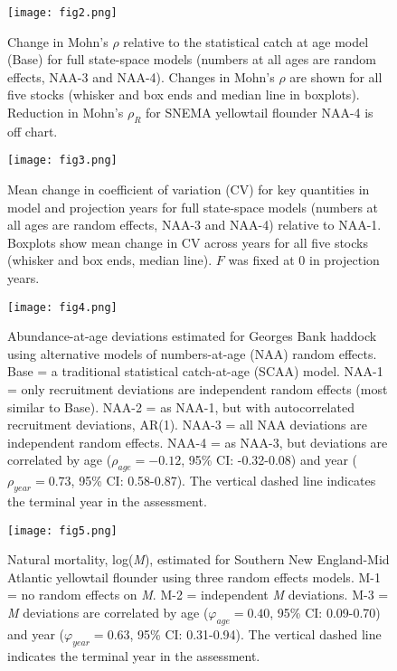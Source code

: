 \documentclass[]{article}
\begin{document}
\begin{figure}

{\centering \texttt{[image: fig2.png]} 

}

\caption{Change in Mohn's $\rho$ relative to the statistical catch at age model (Base) for full state-space models (numbers at all ages are random effects, NAA-3 and NAA-4). Changes in Mohn's $\rho$ are shown for all five stocks (whisker and box ends and median line in boxplots). Reduction in Mohn's $\rho_R$ for SNEMA yellowtail flounder NAA-4 is off chart.}\label{fig:mohns}
\end{figure}

\pagebreak

\begin{figure}

{\centering \texttt{[image: fig3.png]} 

}

\caption{Mean change in coefficient of variation (CV) for key quantities in model and projection years for full state-space models (numbers at all ages are random effects, NAA-3 and NAA-4) relative to NAA-1. Boxplots show mean change in CV across years for all five stocks (whisker and box ends, median line). $F$ was fixed at 0 in projection years.}\label{fig:cv}
\end{figure}

\pagebreak

\begin{figure}

{\centering \texttt{[image: fig4.png]} 

}

\caption{Abundance-at-age deviations estimated for Georges Bank haddock using alternative models of numbers-at-age (NAA) random effects. Base = a traditional statistical catch-at-age (SCAA) model. NAA-1 = only recruitment deviations are independent random effects (most similar to Base). NAA-2 = as NAA-1, but with autocorrelated recruitment deviations, AR(1). NAA-3 = all NAA deviations are independent random effects. NAA-4 = as NAA-3, but deviations are correlated by age ($\rho_{age} = -0.12$, 95\% CI: -0.32-0.08) and year ($\rho_{year} = 0.73$, 95\% CI: 0.58-0.87). The vertical dashed line indicates the terminal year in the assessment.}\label{fig:devs-GBhaddock-naa}
\end{figure}

\pagebreak

\begin{figure}

{\centering \texttt{[image: fig5.png]} 

}

\caption{Natural mortality, log(\textit{M}), estimated for Southern New England-Mid Atlantic yellowtail flounder using three random effects models. M-1 = no random effects on \textit{M}. M-2 = independent \textit{M} deviations. M-3 = \textit{M} deviations are correlated by age ($\varphi_{age} = 0.40$, 95\% CI: 0.09-0.70) and year ($\varphi_{year} = 0.63$, 95\% CI: 0.31-0.94). The vertical dashed line indicates the terminal year in the assessment.}\label{fig:devs-snemayt-m}
\end{figure}
\end{document}

